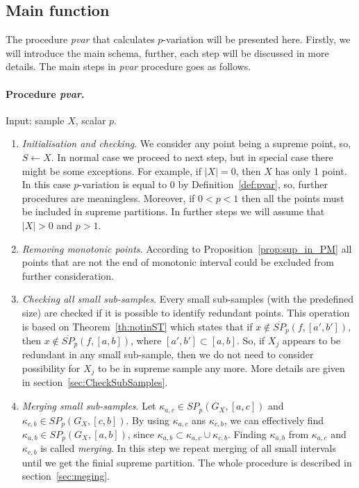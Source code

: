 \documentclass[12pt, a4paper]{article}
\numberwithin{equation}{section}
\begin{document}
\subsection{Main function}
\label{sub:MainFunction}

The procedure \emph{pvar} that calculates
$p$-variation will be presented here. Firstly,
we will introduce the main schema, further, each step will
be discussed in more details. 
The main steps in \emph{pvar} procedure
goes as follows.


\paragraph{Procedure \emph{pvar}.}
Input: sample $X$, scalar $p$.

\begin{enumerate}
  
  \item \emph{Initialisation and checking}. We 
  consider any point being a supreme point,
  so, $S \leftarrow X$. 
  In normal case we proceed to next step, 
  but in special case there might
  be some exceptions. For example, 
  if $|X|=0$, then $X$ has only 1 point.
  In this case $p$-variation is equal to 0 by 
  Definition~\ref{def:pvar}, so, 
  further procedures are meaningless.
  Moreover, if $0 < p < 1$ then all the points must
  be included in supreme partitions.
  In further steps we will assume
  that $|X|>0$ and $p>1$.
  
  \item \emph{Removing monotonic points}. According to 
  Proposition~\ref{prop:sup_in_PM}
  all points that are not the end of 
  monotonic interval could be excluded 
  from further consideration. 
  
  \item \emph{Checking all small sub-samples}. 
  Every small sub-samples (with the predefined size) 
  are checked if it is possible to 
  identify redundant points. 
  This operation is based on 
  Theorem~\ref{th:notinST} which states that 
  if $x \notin \overline{SP}_p(f, [a', b'])$, then 
  $x \notin \overline{SP}_p(f, [a, b])$, where 
  $[a', b'] \subset [a,b]$.
  So, if $X_j$ appears to be redundant in
  any small sub-sample, then
  we do not need to consider possibility for
  $X_j$ to be in supreme sample any more. 
  More details are given in
  section~\ref{sec:CheckSubSamples}.  
 
  \item \emph{Merging small sub-samples}.  
  Let $\kappa_{a,c} \in SP_p(G_X, [a,c])$ and
  $\kappa_{c,b} \in SP_p(G_X, [c, b])$. 
  By using $\kappa_{a,c}$
  ans $\kappa_{c,b}$, we can effectively
  find $\kappa_{a,b} \in SP_p(G_X, [a, b])$, since
  $\kappa_{a,b} \subset \kappa_{a,c} \cup \kappa_{c,b}$. 
  Finding
  $\kappa_{a,b}$ from $\kappa_{a,c}$ and $\kappa_{c,b}$ 
  is called \emph{merging}.
  In this step we repeat merging of all
  small intervals until
  we get the finial supreme partition.
  The whole procedure is described in
  section~\ref{sec:meging}.  
  

\end{enumerate}
\end{document}
